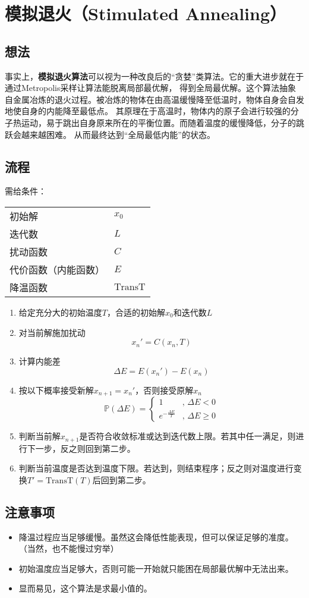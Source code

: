 \documentclass{ctexart}
\begin{document}
\section{模拟退火（Stimulated Annealing）}

\subsection{想法}

事实上，\textbf{模拟退火算法}可以视为一种改良后的``贪婪''类算法。它的重大进步就在于通过Metropolis采样让算法能脱离局部最优解，
得到全局最优解。这个算法抽象自金属冶炼的退火过程。被冶炼的物体在由高温缓慢降至低温时，物体自身会自发地使自身的内能降至最低点。
其原理在于高温时，物体内的原子会进行较强的分子热运动，易于跳出自身原来所在的平衡位置。而随着温度的缓慢降低，分子的跳跃会越来越困难。
从而最终达到``全局最低内能''的状态。

\subsection{流程}

\noindent 需给条件：\\
\begin{tabular}[t]{l|l}
    \hline
    初始解 &  $x_0$\\
    迭代数 & $L$ \\
    扰动函数 & $C$\\
    代价函数（内能函数） & $E$\\
    降温函数 & $\text{TransT}$\\
    \hline
\end{tabular}


\begin{enumerate}
    \item 给定充分大的初始温度$T$，合适的初始解$x_0$和迭代数$L$
    \item 对当前解施加扰动\[x_n' = C(x_n, T)\]
    \item 计算内能差\[\varDelta E = E(x_n') - E(x_n)\]
    \item 按以下概率接受新解$x_{n+1}=x_n'$，否则接受原解$x_n$ \[\mathbb{P} (\varDelta E )=\left\{ 
        \begin{array}{ll}
            1 & \text{, }\varDelta E < 0\\
            e^{-\frac{\varDelta E }{T}} & \text{, }\varDelta E \geq 0
        \end{array} \right.\]
    \item 判断当前解$x_{n+1}$是否符合收敛标准或达到迭代数上限。若其中任一满足，则进行下一步，反之则回到第二步。
    \item 判断当前温度是否达到温度下限。若达到，则结束程序；反之则对温度进行变换$T' = \text{TransT}(T)$后回到第二步。
\end{enumerate}

\subsection{注意事项}

\begin{itemize}
    \item 降温过程应当足够缓慢。虽然这会降低性能表现，但可以保证足够的准度。（当然，也不能慢过穷举）
    \item 初始温度应当足够大，否则可能一开始就只能困在局部最优解中无法出来。
    \item 显而易见，这个算法是求最小值的。
\end{itemize}
\end{document}
